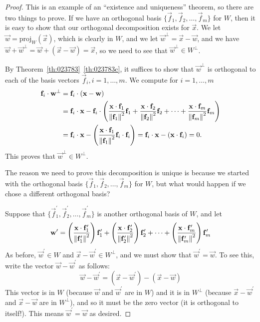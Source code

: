 \documentclass{ximera}
\begin{document}
\begin{proof}
This is an example of an ``existence and uniqueness'' theorem, so there are two things to prove.  If we have an orthogonal basis $\{\vec{f}_{1}, \vec{f}_{2}, \dots, \vec{f}_{m}\}$ for $W$, then it is easy to show that our orthogonal decomposition exists for $\vec{x}$. We let $\vec{w}=\mbox{proj}_W(\vec{x})$, which is clearly in $W$, and we let  $\vec{w}^\perp = \vec{x} - \vec{w}$, and we have $\vec{w} + \vec{w}^\perp = \vec{w} + (\vec{x} - \vec{w}) = \vec{x}$, so we need to see that $\vec{w}^\perp \in W^\perp$.

By Theorem~\ref{th:023783}~\ref{th:023783c}, it suffices to show that $\vec{w}^\perp$ is orthogonal to each of the basis vectors $\vec{f}_i, i=1,\ldots,m$.  We compute for $i=1,\ldots,m$
\begin{align*}
    \mathbf{f}_i \cdot \mathbf{w}^\perp 
    &= \mathbf{f}_i \cdot (\mathbf{x} - \mathbf{w}) \\
    &= \mathbf{f}_i \cdot \mathbf{x} -  \mathbf{f}_i \cdot  \left(\frac{\mathbf{x} \cdot \mathbf{f}_{1}}{\left\lVert\mathbf{f}_{1}\right\rVert^2}\mathbf{f}_{1} + \frac{\mathbf{x} \cdot \mathbf{f}_{2}}{\left\lVert\mathbf{f}_{2}\right\rVert^2}\mathbf{f}_{2}+ \dots +\frac{\mathbf{x} \cdot \mathbf{f}_{m}}{\left\lVert\mathbf{f}_{m}\right\rVert^2}\mathbf{f}_{m}\right) \\
    &= \mathbf{f}_i \cdot \mathbf{x} - \left(\frac{\mathbf{x} \cdot \mathbf{f}_{1}}{\left\lVert\mathbf{f}_{1}\right\rVert^2}\mathbf{f}_i \cdot\mathbf{f}_{i} \right) = \mathbf{f}_i \cdot \mathbf{x} - (\mathbf{x} \cdot \mathbf{f}_i) = 0.
\end{align*}
This proves that $\vec{w}^\perp \in W^\perp$.

The reason we need to prove this decomposition is unique is because we started with the orthogonal basis $\{\vec{f}_{1}, \vec{f}_{2}, \dots, \vec{f}_{m}\}$ for $W$, but what would happen if we chose a different orthogonal basis?  

Suppose that $\{\vec{f}_1^\prime, \vec{f}_2^\prime, \dots, \vec{f}_m^\prime \}$  is another orthogonal basis of $W$, and let
\begin{equation*}
\mathbf{w}^{\prime} = \left(\frac{\mathbf{x} \cdot \mathbf{f}^{\prime}_{1}}{\left\lVert\mathbf{f}^{\prime}_{1}\right\rVert^2}\right)\mathbf{f}^{\prime}_{1} + \left(\frac{\mathbf{x} \cdot \mathbf{f}^{\prime}_{2}}{\left\lVert\mathbf{f}^{\prime}_{2}\right\rVert^2}\right)\mathbf{f}^{\prime}_{2} + \dots +\left(\frac{\mathbf{x} \cdot \mathbf{f}^{\prime}_{m}}{\left\lVert\mathbf{f}^{\prime}_{m}\right\rVert^2}\right)\mathbf{f}^{\prime}_{m}
\end{equation*}
As before, $\vec{w}^{\prime} \in W$ and $\vec{x} - \vec{w}^{\prime} \in W^\perp$, and we must show that $\vec{w}^{\prime} = \vec{w}$. To see this, write the vector $\vec{w} - \vec{w}^\prime$ as follows:
\begin{equation*}
\vec{w} - \vec{w}^{\prime} = (\vec{x} - \vec{w}^{\prime}) - (\vec{x} - \vec{w})
\end{equation*}
This vector is in $W$ (because $\vec{w}$ and $\vec{w}^\prime$ are in $W$) and it is in $W^\perp$ (because $\vec{x} - \vec{w}^\prime$ and $\vec{x} - \vec{w}$ are in $W^\perp$), and so it must be the zero vector (it is orthogonal to itself!). This means $\vec{w}^\prime = \vec{w}$ as desired.
\end{proof}
\end{document}
